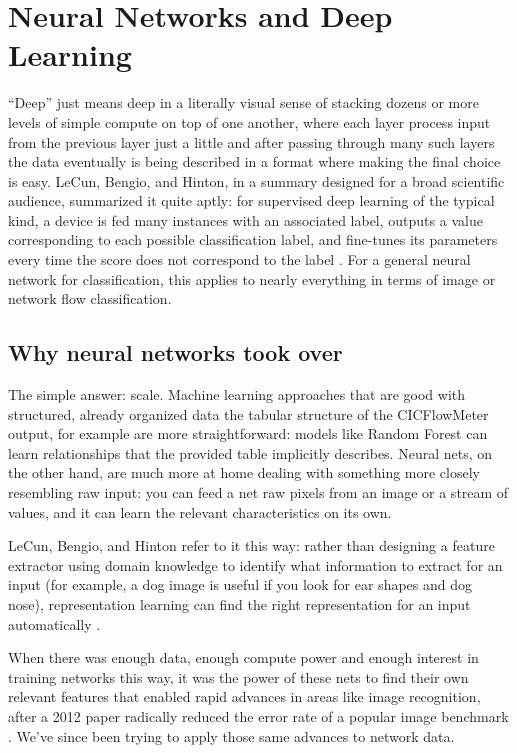 \section{Neural Networks and Deep Learning}
\label{sec:deep_learning}

“Deep” just means deep in a literally visual sense of stacking dozens or more levels of simple compute on top of one another, where each layer process input from the previous layer just a little and after passing through many such layers the data eventually is being described in a format where making the final choice is easy.   LeCun, Bengio, and Hinton, in a summary designed for a broad scientific audience, summarized it quite aptly: for supervised deep learning of the typical kind, a device is fed many instances with an associated label, outputs a value corresponding to each possible classification label, and fine-tunes its parameters every time the score does not correspond to the label \cite{lecun2015deep}. For a general neural network for classification, this applies to nearly everything in terms of image or network flow classification.
 
\subsection{Why neural networks took over}
 
The simple answer: scale. Machine learning approaches that are good with structured, already organized data the tabular structure of the CICFlowMeter output, for example are more straightforward: models like Random Forest can learn relationships that the provided table implicitly describes. Neural nets, on the other hand, are much more at home dealing with something more closely resembling raw input: you can feed a net raw pixels from an image or a stream of values, and it can learn the relevant characteristics on its own. 

LeCun, Bengio, and Hinton refer to it this way: rather than designing a feature extractor using domain knowledge to identify what information to extract for an input (for example, a dog image is useful if you look for ear shapes and dog nose), representation learning can find the right representation for an input automatically \cite{lecun2015deep}. 

When there was enough data, enough compute power and enough interest in training networks this way, it was the power of these nets to find their own relevant features that enabled rapid advances in areas like image recognition, after a 2012 paper radically reduced the error rate of a popular image benchmark \cite{krizhevsky2012imagenet}. We’ve since been trying to apply those same advances to network data.
 
